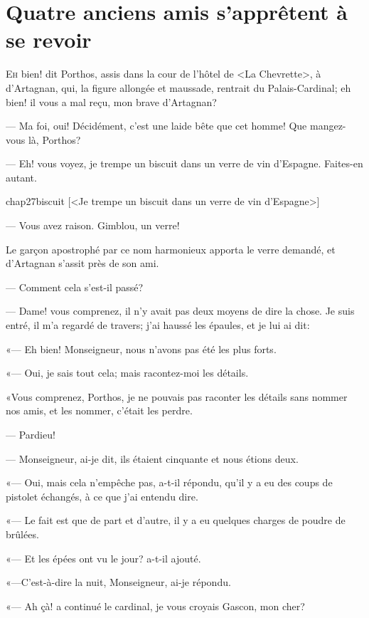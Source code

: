 \chapter{Quatre anciens amis s'apprêtent à se revoir}

\lettrine[ante=—]{E}{h} bien! dit Porthos, assis dans la cour de l'hôtel de <La Chevrette>, à d'Artagnan, qui, la figure allongée et maussade, rentrait du Palais-Cardinal; eh bien! il vous a mal reçu, mon brave d'Artagnan?

\zz
— Ma foi, oui! Décidément, c'est une laide bête que cet homme! Que mangez-vous là, Porthos?

— Eh! vous voyez, je trempe un biscuit dans un verre de vin d'Espagne. Faites-en autant.

\begin{bwbigpic}
	[\basicscale] 
	{chap27biscuit}
	[<Je trempe un biscuit dans un verre de vin d'Espagne>]
\end{bwbigpic}

— Vous avez raison. Gimblou, un verre!

Le garçon apostrophé par ce nom harmonieux apporta le verre demandé, et d'Artagnan s'assit près de son ami.

— Comment cela s'est-il passé?

— Dame! vous comprenez, il n'y avait pas deux moyens de dire la chose. Je suis entré, il m'a regardé de travers; j'ai haussé les épaules, et je lui ai dit:

«— Eh bien! Monseigneur, nous n'avons pas été les plus forts.

«— Oui, je sais tout cela; mais racontez-moi les détails.

«Vous comprenez, Porthos, je ne pouvais pas raconter les détails sans nommer nos amis, et les nommer, c'était les perdre.

— Pardieu!

— Monseigneur, ai-je dit, ils étaient cinquante et nous étions deux.

«— Oui, mais cela n'empêche pas, a-t-il répondu, qu'il y a eu des coups de pistolet échangés, à ce que j'ai entendu dire.

«— Le fait est que de part et d'autre, il y a eu quelques charges de poudre de brûlées.

«— Et les épées ont vu le jour? a-t-il ajouté.

«—C'est-à-dire la nuit, Monseigneur, ai-je répondu.

«— Ah çà! a continué le cardinal, je vous croyais Gascon, mon cher?

